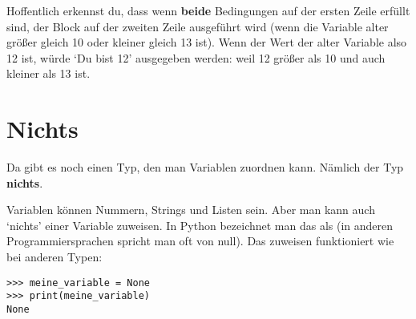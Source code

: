 Hoffentlich erkennst du, dass wenn \textbf{beide} Bedingungen auf der ersten Zeile erfüllt sind, der Block auf der zweiten Zeile ausgeführt wird (wenn die Variable alter größer gleich 10 oder kleiner gleich 13 ist). Wenn der Wert der alter Variable also 12 ist, würde `Du bist 12' ausgegeben werden: weil 12 größer als 10 und auch kleiner als 13 ist.

\section{Nichts}

Da gibt es noch einen Typ, den man Variablen zuordnen kann. Nämlich der Typ \textbf{nichts}.
\par
Variablen können Nummern, Strings und Listen sein. Aber man kann auch `nichts' einer Variable zuweisen. In Python bezeichnet man das als  (in anderen Programmiersprachen spricht man oft von null). Das zuweisen funktioniert wie bei anderen Typen:

\begin{listing}
\begin{verbatim}
>>> meine_variable = None
>>> print(meine_variable)
None
\end{verbatim}
\end{listing}

